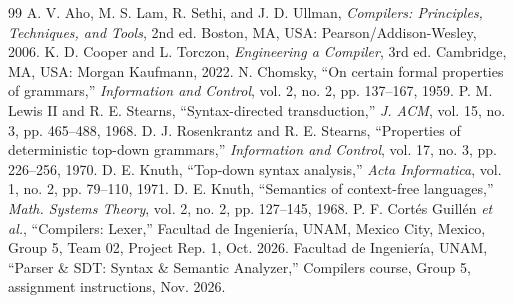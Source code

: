 \documentclass[11pt,a4paper]{article}
\begin{document}
\begin{thebibliography}{99}
 A. V. Aho, M. S. Lam, R. Sethi, and J. D. Ullman, \emph{Compilers: Principles, Techniques, and Tools}, 2nd ed. Boston, MA, USA: Pearson/Addison-Wesley, 2006.
 K. D. Cooper and L. Torczon, \emph{Engineering a Compiler}, 3rd ed. Cambridge, MA, USA: Morgan Kaufmann, 2022.
 N. Chomsky, ``On certain formal properties of grammars,'' \emph{Information and Control}, vol. 2, no. 2, pp. 137--167, 1959.
 P. M. Lewis II and R. E. Stearns, ``Syntax-directed transduction,'' \emph{J. ACM}, vol. 15, no. 3, pp. 465--488, 1968.
 D. J. Rosenkrantz and R. E. Stearns, ``Properties of deterministic top-down grammars,'' \emph{Information and Control}, vol. 17, no. 3, pp. 226--256, 1970.
 D. E. Knuth, ``Top-down syntax analysis,'' \emph{Acta Informatica}, vol. 1, no. 2, pp. 79--110, 1971.
 D. E. Knuth, ``Semantics of context-free languages,'' \emph{Math. Systems Theory}, vol. 2, no. 2, pp. 127--145, 1968.
 P. F. Cort\'es Guill\'en \emph{et al.}, ``Compilers: Lexer,'' Facultad de Ingenier\'ia, UNAM, Mexico City, Mexico, Group 5, Team 02, Project Rep. 1, Oct. 2026.
 Facultad de Ingenier\'ia, UNAM, ``Parser \& SDT: Syntax \& Semantic Analyzer,'' Compilers course, Group 5, assignment instructions, Nov. 2026.
\end{thebibliography}
\end{document}
